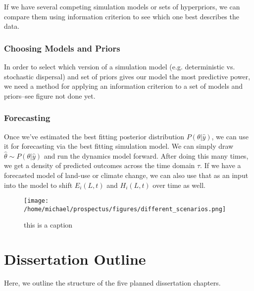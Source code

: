 \documentclass[]{article}
\begin{document}
If we have several competing simulation models or sets of hyperpriors, we can compare them using information criterion to see which one best describes the data.


\hypertarget{choosing-models-and-priors}{%
\subsubsection{Choosing Models and Priors}\label{choosing-models-and-priors}}

In order to select which version of a simulation model (e.g. deterministic vs. stochastic dispersal) and set of priors gives our model the most predictive power, we need a method for applying an information criterion to a set of models and priors--see figure not done yet.

\hypertarget{forecasting}{%
\subsubsection{Forecasting}\label{forecasting}}

Once we've estimated the best fitting posterior distribution $P(\theta | \hat{y})$, we can use it for forecasting via the best fitting simulation model. We can simply draw $\hat{\theta} \sim P(\theta | \hat{y})$ and run the dynamics model forward. After doing this many times, we get a density of predicted outcomes across the time domain $\tau$. If we have a forecasted model of land-use or climate change, we can also use that as an input into the model to shift $E_i(L, t)$ and $H_i(L,t)$ over time as well.

\begin{figure}[H]
\centering
\texttt{[image: /home/michael/prospectus/figures/different\_scenarios.png]}
\caption{this is a caption}
\end{figure}



%
%
%
\clearpage
\hypertarget{dissertation-outline}{%
\section{Dissertation Outline}\label{dissertation-outline}}

Here, we outline the structure of the five planned dissertation chapters.
\end{document}
